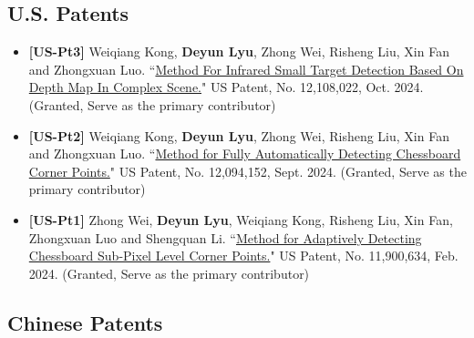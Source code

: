 \documentclass[11pt,a4paper]{moderncv}        %
\begin{document}
\subsection{U.S. Patents}
\begin{itemize}
    \item \textbf{[US-Pt3]} Weiqiang Kong, \textbf{Deyun Lyu}, Zhong Wei, Risheng Liu, Xin Fan and Zhongxuan Luo. ``\href{https://patents.google.com/patent/US20220174256A1/en}{Method For Infrared Small Target Detection Based On Depth Map In Complex Scene.}" US Patent, No. 12,108,022, Oct. 2024. (Granted, Serve as the primary contributor)
    \item \textbf{[US-Pt2]} Weiqiang Kong, \textbf{Deyun Lyu}, Zhong Wei, Risheng Liu, Xin Fan and Zhongxuan Luo. ``\href{https://patents.google.com/patent/US20220148213A1/en}{Method for Fully Automatically Detecting Chessboard Corner Points.}" US Patent, No. 12,094,152, Sept. 2024. (Granted, Serve as the primary contributor)
    \item \textbf{[US-Pt1]} Zhong Wei, \textbf{Deyun Lyu}, Weiqiang Kong, Risheng Liu, Xin Fan, Zhongxuan Luo and Shengquan Li. ``\href{https://patents.google.com/patent/US11900634B2/en}{Method for Adaptively Detecting Chessboard Sub-Pixel Level Corner Points.}" US Patent, No. 11,900,634, Feb. 2024. (Granted, Serve as the primary contributor)
\end{itemize}

\subsection{Chinese Patents}
\end{document}
